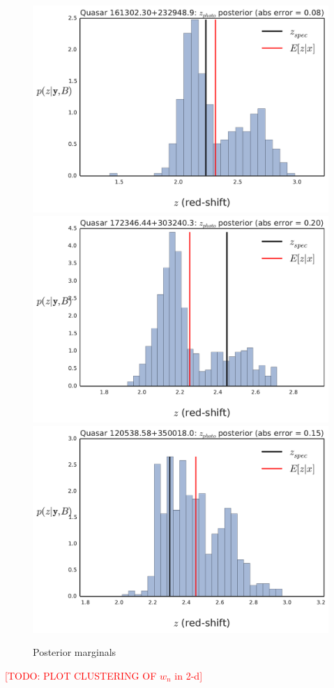 \documentclass{article}
\newcommand{\red}[1]{\textcolor{red}{[TODO: #1]}}
\begin{document}
\begin{figure}[ht]
\vskip 0.2in
\begin{center}
\centerline{
\includegraphics[width=.66\columnwidth]{../figs/quasar_plots/quasar_147_posterior_z}
\includegraphics[width=.66\columnwidth]{../figs/quasar_plots/quasar_175_posterior_z}
\includegraphics[width=.66\columnwidth]{../figs/quasar_plots/quasar_444_posterior_z}
}
\vskip -0.2in
\caption{Posterior marginals}
\label{fig:frames}
\end{center}
\end{figure}


\red{PLOT CLUSTERING OF $w_n$ in 2-d}
\end{document}
